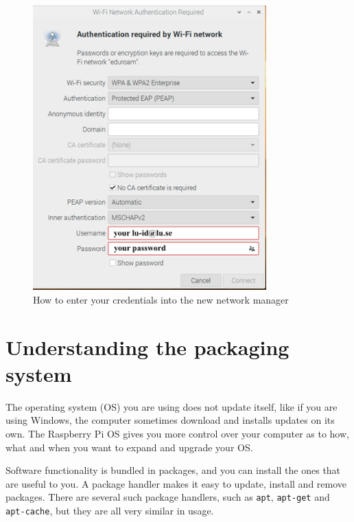 \documentclass{article}
\begin{document}
\begin{figure}[h]
    \centering
    \includegraphics[width=90mm]{eduroam.png}
    \caption{How to enter your credentials into the new network manager}
    \label{fig:eduroam}
\end{figure}



\section{Understanding the packaging system}
The operating system (OS) you are using does not update itself, like if you are using Windows, the computer sometimes download and installs updates on its own. The Raspberry Pi OS gives you more control over your computer as to how, what and when you want to expand and upgrade your OS.

Software functionality is bundled in packages, and you can install the ones that are useful to you. A package handler makes it easy to update, install and remove packages. There are several such package handlers, such as \verb!apt!, \verb!apt-get! and \verb!apt-cache!, but they are all very similar in usage.
\end{document}

